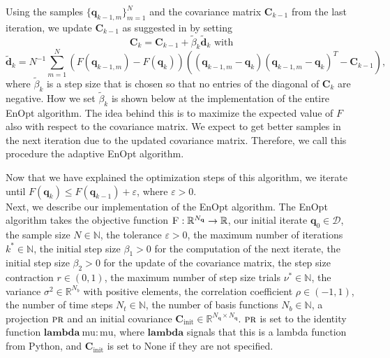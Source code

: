 Using the samples $\{\mathbf{q}_{k-1,m}\}_{m=1}^N$ and the covariance matrix $\mathbf{C}_{k-1}$ from the last iteration, we update $\mathbf{C}_{k-1}$ as suggested in \cite{Stordal2016-cj} by setting
\begin{equation}
\label{updateCov}
\mathbf{C}_k=\mathbf{C}_{k-1}+\tilde{\beta}_k\tilde{\mathbf{d}}_k\text{ with}
\end{equation}
\begin{equation}
\label{updateCovDirection}
\tilde{\mathbf{d}}_k=N^{-1}\sum_{m=1}^N(F(\mathbf{q}_{k-1,m})-F(\mathbf{q}_k))((\mathbf{q}_{k-1,m}-\mathbf{q}_k)(\mathbf{q}_{k-1,m}-\mathbf{q}_k)^T-\mathbf{C}_{k-1}),
\end{equation}
where $\tilde{\beta}_k$ is a step size that is chosen so that no entries of the diagonal of $\mathbf{C}_k$ are negative. How we set $\tilde{\beta}_k$ is shown below at the implementation of the entire EnOpt algorithm. The idea behind this is to maximize the expected value of $F$ also with respect to the covariance matrix. We expect to get better samples in the next iteration due to the updated covariance matrix. Therefore, we call this procedure the adaptive EnOpt algorithm.

Now that we have explained the optimization steps of this algorithm, we iterate until $F(\mathbf{q}_k)\leq F(\mathbf{q}_{k-1})+\varepsilon$, where $\varepsilon>0$.\\

Next, we describe our implementation of the EnOpt algorithm. The EnOpt algorithm takes the objective function $\textproc{F}:\mathbb{R}^{N_\mathbf{q}}\to\mathbb{R}$, our initial iterate $\mathbf{q}_0\in\mathcal{D}$, the sample size $N\in\mathbb{N}$, the tolerance $\varepsilon>0$, the maximum number of iterations $k^*\in\mathbb{N}$, the initial step size $\beta_1>0$ for the computation of the next iterate, the initial step size $\beta_2>0$ for the update of the covariance matrix, the step size contraction $r\in(0,1)$, the maximum number of step size trials $\nu^*\in\mathbb{N}$, the variance $\sigma^2\in\mathbb{R}^{N_b}$ with positive elements, the correlation coefficient $\rho\in(-1,1)$, the number of time steps $N_t\in\mathbb{N}$, the number of basis functions $N_b\in\mathbb{N}$, a projection $\textproc{pr}$ and an initial covariance $\mathbf{C}_\mathrm{init}\in\mathbb{R}^{N_\mathbf{q}\times N_\mathbf{q}}$. $\textproc{pr}$ is set to the identity function $\mathbf{lambda}\:\mathrm{mu}: \mathrm{mu}$, where $\mathbf{lambda}$ signals that this is a lambda function from Python, and $\mathbf{C}_\mathrm{init}$ is set to $\mathrm{None}$ if they are not specified.

